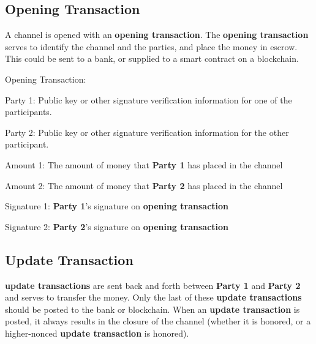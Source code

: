 \documentclass[a4paper]{article}
\newcommand{\bgls}[1]{\textbf{\gls{#1}}}
\newcommand{\bglspl}[1]{\textbf{\glspl{#1}}}
\newenvironment{mydescription}
{\begin{description}
\setlength{\itemsep}{5pt}
  \setlength{\parskip}{0pt}
  \setlength{\labelsep}{5pt}
}{
\end{description}}
\begin{document}
\subsection{Opening Transaction}

A channel is opened with an \bgls{opening transaction}. The \bgls{opening transaction} serves to identify the channel and the parties, and place the money in escrow. This could be sent to a bank, or supplied to a smart contract on a blockchain.

\begin{mdframed}[style=message]
\begin{mydescription}
\item[Opening Transaction:] \hfill
  \begin{mydescription}
  \item[Party 1:] Public key or other signature verification information for one of the participants.
  \item[Party 2:] Public key or other signature verification information for the other participant.
  \item[Amount 1:] The amount of money that \textbf{Party 1} has placed in the channel
  \item[Amount 2:] The amount of money that \textbf{Party 2} has placed in the channel
  \end{mydescription}
\item[Signature 1:] \textbf{Party 1}'s signature on \bgls{opening transaction}
\item[Signature 2:] \textbf{Party 2}'s signature on \bgls{opening transaction}
\end{mydescription}
\end{mdframed}

\subsection{Update Transaction}

\bglspl{update transaction} are sent back and forth between \textbf{Party 1} and \textbf{Party 2} and serves to transfer the money. Only the last of these \bglspl{update transaction} should be posted to the bank or blockchain. When an \bgls{update transaction} is posted, it always results in the closure of the channel (whether it is honored, or a higher-nonced \bgls{update transaction} is honored).
\end{document}
